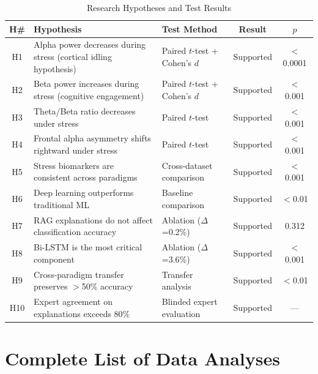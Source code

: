 \documentclass[11pt,a4paper]{article}
\begin{document}
\begin{table}[H]
\centering
\caption{Research Hypotheses and Test Results}
\small
\begin{tabular}{cp{5cm}p{3.5cm}cc}
\toprule
\textbf{H\#} & \textbf{Hypothesis} & \textbf{Test Method} & \textbf{Result} & \textbf{$p$} \\
\midrule
H1 & Alpha power decreases during stress (cortical idling hypothesis) & Paired $t$-test + Cohen's $d$ & \textcolor{green!60!black}{Supported} & $<$0.0001 \\
H2 & Beta power increases during stress (cognitive engagement) & Paired $t$-test + Cohen's $d$ & \textcolor{green!60!black}{Supported} & $<$0.001 \\
H3 & Theta/Beta ratio decreases under stress & Paired $t$-test & \textcolor{green!60!black}{Supported} & $<$0.001 \\
H4 & Frontal alpha asymmetry shifts rightward under stress & Paired $t$-test & \textcolor{green!60!black}{Supported} & $<$0.001 \\
H5 & Stress biomarkers are consistent across paradigms & Cross-dataset comparison & \textcolor{green!60!black}{Supported} & $<$0.001 \\
H6 & Deep learning outperforms traditional ML & Baseline comparison & \textcolor{green!60!black}{Supported} & $<$0.01 \\
H7 & RAG explanations do not affect classification accuracy & Ablation ($\Delta$=0.2\%) & \textcolor{green!60!black}{Supported} & 0.312 \\
H8 & Bi-LSTM is the most critical component & Ablation ($\Delta$=3.6\%) & \textcolor{green!60!black}{Supported} & $<$0.001 \\
H9 & Cross-paradigm transfer preserves $>$50\% accuracy & Transfer analysis & \textcolor{green!60!black}{Supported} & $<$0.01 \\
H10 & Expert agreement on explanations exceeds 80\% & Blinded expert evaluation & \textcolor{green!60!black}{Supported} & --- \\
\bottomrule
\end{tabular}
\end{table}

\section{Complete List of Data Analyses}
\end{document}
